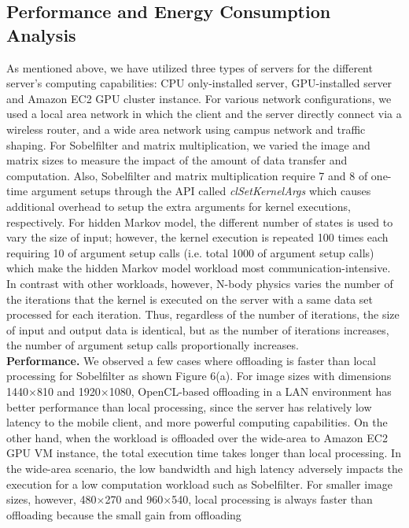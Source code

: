 \documentclass[10pt, conference, compsocconf]{IEEEtran}
\begin{document}
\subsection{Performance and Energy Consumption Analysis}
%
As mentioned above, we have utilized three types of servers for the 
different server’s computing capabilities: CPU only-installed server, 
GPU-installed server and Amazon EC2 GPU cluster instance.
%
For various network configurations, we used a local area network in which
the client and the server directly connect via a wireless router, and a wide 
area network using campus network and traffic shaping.
%
For Sobelfilter and matrix multiplication, we varied the image and matrix 
sizes to measure the impact of the amount of data transfer and computation.
%
Also, Sobelfilter and matrix multiplication require 7 and 8 of one-time 
argument setups through the API called \textit{clSetKernelArgs} which causes additional
overhead to setup the extra arguments for kernel executions, respectively.
%
For hidden Markov model, the different number of states is used to vary 
the size of input; however, the kernel execution is repeated 100 times each 
requiring 10 of argument setup calls (i.e. total 1000 of argument 
setup calls) which make the hidden Markov model workload most 
communication-intensive.
%
In contrast with other workloads, however, N-body physics varies the 
number of the iterations that the kernel is executed on the server with
a same data set processed for each iteration.
%
Thus, regardless of the number of iterations, the size of input and output
data is identical, but as the number of iterations increases, the number of
argument setup calls proportionally increases.\\
%
\indent\textbf{Performance.} We observed a few cases where offloading is faster than local 
processing for Sobelfilter as shown Figure 6(a).
%
For image sizes with dimensions 1440$\times$810 and 1920$\times$1080, OpenCL-based 
offloading in a LAN environment has better performance than local processing,
since the server has relatively low latency to the mobile client, and more
powerful computing capabilities.
%
On the other hand, when the workload is offloaded over the wide-area to
Amazon EC2 GPU VM instance, the total execution time takes longer than
local processing.
%
In the wide-area scenario, the low bandwidth and high latency adversely
impacts the execution for a low computation workload such as Sobelfilter.
%
For smaller image sizes, however, 480$\times$270 and 960$\times$540, local processing
is always faster than offloading because the small gain from offloading 
\end{document}
